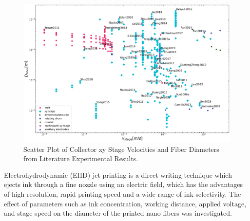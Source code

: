 \begin{figure}[!th]
\centering
\includegraphics[width=\textwidth]{./Figures/plt_vstagems_vs_Dfiberm.png}
\decoRule
\caption[Scatter Plot of Collector xy Stage Velocities and Fiber Diameters from Literature Experimental Results]{Scatter Plot of Collector xy Stage Velocities and Fiber Diameters from Literature Experimental Results. \cite{
  Yang2019,Fattahi2017,Shin2019,Wang2015,Parajuli2016,Zheng2010,Fuh2011,Dalton2015,
  Ru2014,Xue2014,Wang2017,Xu2014,Liu2013,Pan2014,Canton2014,Chakraborty2009,Gupta2007,
  He2018,Zhou2011,Chen2013,Williams2018,Choi2017,Pan2019,Lei2015,Lim2019,Park2020,
  Fuh2012,Flores2017,Chang2010,Xu2019,Zhang2019,Shin2018,Fuh2015,Nagle2019,Zheng2012,
  Kameoka2003a,Liu2014,E.King2019,Hochleitner2017,Madou2011,Jiang2018,Husain2016,
  ElectrospinTech2015,Brown2011,Kolan2018,Chang2011,Beachley2011,Camillo2013,Kameoka2003,
  Bu2012,Lee2012,Huang2015,Coppola2020,CisquellaSerra2019,Ruggieri2013,Hochleitner2014,
  Zhu2016,Brown2014,Chang2008,Sonntag2020,Kim2018,Deng2020,Han2019,George2020,Sun2006a,
  Pan2015,Shen2016,Strauss2019,Fuh2013,Sarkar2007,You2017,Wang2018a,Zheng2014,Song2015,
  GaofengZheng2010,Liu2015a,Min2013,Luo2016,Yousefi2019,Cardenas2017,Coppola2014}}
\label{fig:plt_vstagems_vs_Dfiberm}
\end{figure}


Electrohydrodynamic (EHD) jet printing is a direct-writing technique which ejects ink through a fine nozzle using an electric field, which has the advantages of high-resolution, rapid printing speed and a wide range of ink selectivity. The effect of parameters such as ink concentration, working distance, applied voltage, and stage speed on the diameter of the printed nano fibers was investigated.

